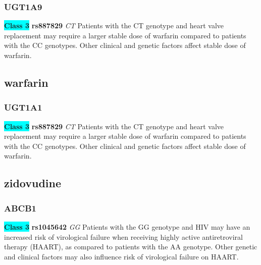 \documentclass{book}
\begin{document}
\subsubsection{ UGT1A9 }

\begin{center}
\textbf{\colorbox{cyan} {Class 3}} \textbf{ rs887829 } \textit{ CT }
Patients with the CT genotype and heart valve replacement may require a larger stable dose of warfarin compared to patients with the CC genotypes. Other clinical and genetic factors affect stable dose of warfarin.


\end{center}\subsection{ warfarin }


\subsubsection{ UGT1A1 }

\begin{center}
\textbf{\colorbox{cyan} {Class 3}} \textbf{ rs887829 } \textit{ CT }
Patients with the CT genotype and heart valve replacement may require a larger stable dose of warfarin compared to patients with the CC genotypes. Other clinical and genetic factors affect stable dose of warfarin.


\end{center}\subsection{ zidovudine }


\subsubsection{ ABCB1 }

\begin{center}
\textbf{\colorbox{cyan} {Class 3}} \textbf{ rs1045642 } \textit{ GG }
Patients with the GG genotype and HIV may have an increased risk of virological failure when receiving highly active antiretroviral therapy (HAART), as compared to patients with the AA genotype. Other genetic and clinical factors may also influence risk of virological failure on HAART.


\end{center}
\end{document}
